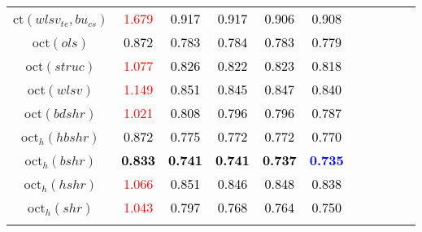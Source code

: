 \begin{tabular}[t]{c|>{}cccc>{}c|ccccc}
ct$(wlsv_{te}, bu_{cs})$ & \textcolor{red}{1.679} & \textcolor{black}{0.917} & \textcolor{black}{0.917} & \textcolor{black}{0.906} & \textcolor{black}{0.908} &  &  &  &  & \\
oct$(ols)$ & \textcolor{black}{0.872} & \textcolor{black}{0.783} & \textcolor{black}{0.784} & \textcolor{black}{0.783} & \textcolor{black}{0.779} &  &  &  &  & \\
oct$(struc)$ & \textcolor{red}{1.077} & \textcolor{black}{0.826} & \textcolor{black}{0.822} & \textcolor{black}{0.823} & \textcolor{black}{0.818} &  &  &  &  & \\
oct$(wlsv)$ & \textcolor{red}{1.149} & \textcolor{black}{0.851} & \textcolor{black}{0.845} & \textcolor{black}{0.847} & \textcolor{black}{0.840} &  &  &  &  & \\
oct$(bdshr)$ & \textcolor{red}{1.021} & \textcolor{black}{0.808} & \textcolor{black}{0.796} & \textcolor{black}{0.796} & \textcolor{black}{0.787} &  &  &  &  & \\
oct$_h(hbshr)$ & \textcolor{black}{0.872} & \textcolor{black}{0.775} & \textcolor{black}{0.772} & \textcolor{black}{0.772} & \textcolor{black}{0.770} &  &  &  &  & \\
oct$_h(bshr)$ & \textcolor{black}{\textbf{0.833}} & \textcolor{black}{\textbf{0.741}} & \textcolor{black}{\textbf{0.741}} & \textcolor{black}{\textbf{0.737}} & \textcolor{blue}{\textbf{0.735}} &  &  &  &  & \\
oct$_h(hshr)$ & \textcolor{red}{1.066} & \textcolor{black}{0.851} & \textcolor{black}{0.846} & \textcolor{black}{0.848} & \textcolor{black}{0.838} &  &  &  &  & \\
oct$_h(shr)$ & \textcolor{red}{1.043} & \textcolor{black}{0.797} & \textcolor{black}{0.768} & \textcolor{black}{0.764} & \textcolor{black}{0.750} &  &  &  &  & \\
\bottomrule
{}\\
\end{tabular}
